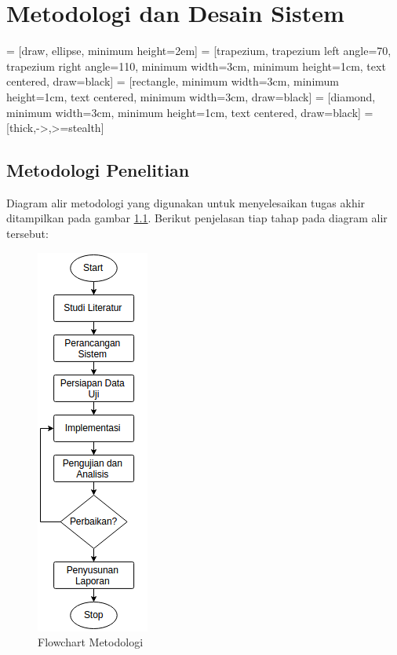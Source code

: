 \chapter{Metodologi dan Desain Sistem}

\usetikzlibrary{positioning}
 = [draw, ellipse, minimum height=2em]
 = [trapezium, trapezium left angle=70, trapezium right angle=110, minimum width=3cm, minimum height=1cm, text centered, draw=black]
 = [rectangle, minimum width=3cm, minimum height=1cm, text centered, minimum width=3cm, draw=black]
 = [diamond, minimum width=3cm, minimum height=1cm, text centered, draw=black]
 = [thick,->,>=stealth]

\section{Metodologi Penelitian}
Diagram alir metodologi yang digunakan untuk menyelesaikan tugas akhir ditampilkan pada gambar \ref{flow:fig_flow_method}. Berikut penjelasan tiap tahap pada diagram alir tersebut:

\begin{figure}[H]
    \centering
	\includegraphics[scale=0.73]{images/flowchart_metodologi.png}
    \caption{Flowchart Metodologi}
	\label{flow:fig_flow_method}
\end{figure}

